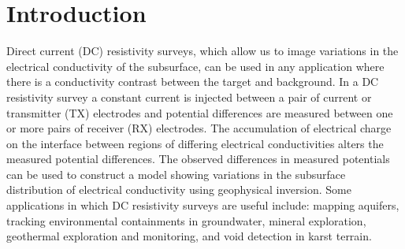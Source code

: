 \documentclass[preprint,authoryear,12pt]{elsarticle}
\begin{document}

\linenumbers


\section{Introduction}
\label{Introduction}

Direct current (DC) resistivity surveys, which allow us to image variations in the electrical conductivity of the subsurface, can be used in any application where there is a conductivity contrast between the target and background. In a DC resistivity survey a constant current is injected between a pair of current or transmitter (TX) electrodes and potential differences are measured between one or more pairs of receiver (RX) electrodes. The accumulation of electrical charge on the interface between regions of differing electrical conductivities alters the measured potential differences. The observed differences in measured potentials can be used to construct a model showing variations in the subsurface distribution of electrical conductivity using geophysical inversion. Some applications in which DC resistivity surveys are useful include: mapping aquifers, tracking environmental containments in groundwater,  mineral exploration, geothermal exploration and monitoring, and void detection in karst terrain.
\end{document}
